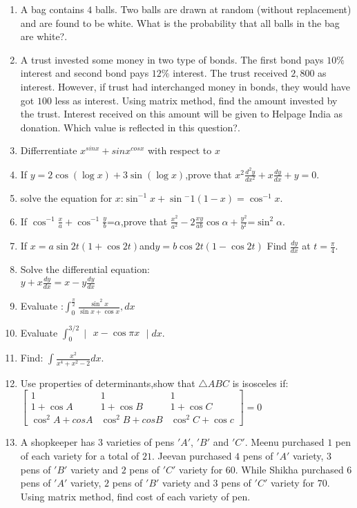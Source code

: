 \documentclass[12pt,-letter paper]{article}
\providecommand{\mydet}[1]{\ensuremath{\begin{vmatrix}#1\end{vmatrix}}}
\providecommand{\myvec}[1]{\ensuremath{\begin{bmatrix}#1\end{bmatrix}}}
\providecommand{\brak}[1]{\ensuremath{\left(#1\right)}}
\begin{document}
\begin{enumerate}
\item  A bag contains $4$ balls. Two balls are drawn at random (without replacement) and are found to be white. What is the probability that all balls in the bag are white?.
\item A trust invested some money in two type of bonds. The first bond pays $10\%$ interest and second bond pays $12\%$ interest. The trust received \rupee$2,800$ as interest. However, if trust had interchanged money in bonds, they would have got \rupee$100$ less as interest. Using matrix method, find the amount invested by the trust. Interest received on this amount will be given to Helpage India as donation. Which value is reflected in this question?.
\item Differrentiate $x^{sinx}+sinx^{cosx}$ with respect to $x$
\item If $ y=2\cos\brak{\log x}+3\sin\brak{\log x}$,prove that $x^2\frac{d^2y}{dx^2}+x\frac{dy}{dx}+y=0$.
\item solve the equation for $x$:$\sin^{-1}x+\sin{^-1}(1-x) = \cos^{-1}x$.
\item If $\cos^{-1}\frac{x}{a}+\cos^{-1}\frac{y}{b}$=$\alpha$,prove that $\frac{x^2}{a^2}-2\frac{xy}{ab}\cos\alpha+\frac{y^2}{b^2}$=$\sin^2\alpha$.
\item If  $x= a \sin 2t \brak{1 + \cos 2t}$and$y= b \cos 2t\brak{1 - \cos 2t}$
Find $\frac{dy}{dx}$ at $ t = \frac{\pi}{4}$.
\item Solve the differential equation:\\           $ y + x \frac{dy}{dx} = x - y \frac{dy}{dx}$
\item Evaluate :$\int_{0}^{\frac{\pi}{2}} \frac{\sin^2 x}{\sin x + \cos x}, dx$
\item Evaluate  $\int_{0}^{3/2}\mydet{x-\cos \pi x}dx$.	
\item Find: $\int \frac{x^2}{x^4+x^2-2}dx.$
\item Use properties of determinants,show that $\triangle{ABC}$ is isosceles if:\\
$\myvec{1 & 1 & 1 \\ 1+\cos A & 1+\cos B & 1+\cos C \\ \cos^2A+cosA & \cos^2B+cosB & \cos^2C+\cos c}=0$
\item A shopkeeper has $3$ varieties of pens $'A'$, $'B'$ and $'C'$. Meenu purchased $1$ pen of each variety for a total of \rupee$21$. Jeevan purchased $4$ pens of $'A'$ variety, $3$ pens of $'B'$ variety and $2$ pens of $'C'$ variety for \rupee$60$. While Shikha purchased $6$ pens of $'A'$ variety, $2$ pens of $'B'$ variety and $3$ pens of $'C'$ variety for \rupee$70$. Using matrix method, find cost of each variety of pen.

\end{enumerate}
\end{document}
